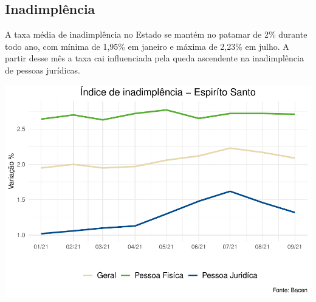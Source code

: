 \documentclass[100,a4paperpaper,]{article}
\begin{document}
\newpage
\subsection {Inadimplência}

A taxa média de inadimplência no Estado se mantém no patamar de 2\%
durante todo ano, com mínima de 1,95\% em janeiro e máxima de 2,23\% em
julho. A partir desse mês a taxa cai influenciada pela queda ascendente
na inadimplência de pessoas jurídicas.

\includegraphics{credito_files/figure-latex/inadimplencia es-1.pdf}
\end{document}
